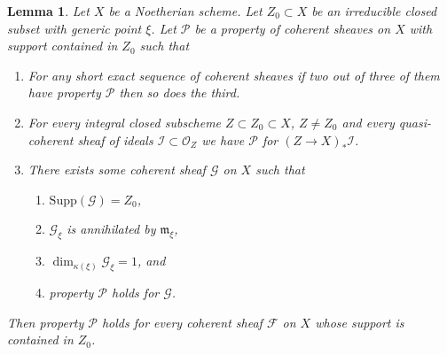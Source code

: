 \documentclass[10pt,a4paper]{amsart}
\theoremstyle{plain}
\newtheorem{lemma}[subsection]{Lemma}
\theoremstyle{definition}
\theoremstyle{remark}
\numberwithin{equation}{subsection}
\begin{document}
\begin{lemma}
\label{lemma-property-irreducible}
Let $X$ be a Noetherian scheme. Let $Z_0 \subset X$ be an irreducible closed
subset with generic point $\xi$. Let $\mathcal{P}$ be a property of coherent
sheaves on $X$ with support contained in $Z_0$ such that
\begin{enumerate}
\item For any short exact sequence of coherent sheaves if two
out of three of them have property $\mathcal{P}$ then so does the
third.
\item For every integral closed subscheme $Z \subset Z_0 \subset X$,
$Z \not = Z_0$ and every quasi-coherent sheaf of ideals
$\mathcal{I} \subset \mathcal{O}_Z$ we have
$\mathcal{P}$ for $(Z \to X)_*\mathcal{I}$.
\item There exists some coherent sheaf $\mathcal{G}$ on $X$ such that
\begin{enumerate}
\item $\text{Supp}(\mathcal{G}) = Z_0$,
\item $\mathcal{G}_\xi$ is annihilated by $\mathfrak m_\xi$,
\item $\dim_{\kappa(\xi)} \mathcal{G}_\xi = 1$, and
\item property $\mathcal{P}$ holds for $\mathcal{G}$.
\end{enumerate}
\end{enumerate}
Then property $\mathcal{P}$ holds for every coherent sheaf
$\mathcal{F}$ on $X$ whose support is contained in $Z_0$.
\end{lemma}
\end{document}
